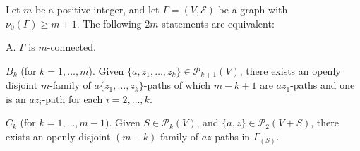 Let $m$ be a positive integer, and let $\Gamma = (V, \mathcal{E})$ be a graph with $\nu_0(\Gamma) \geq m + 1$. The following $2m$ statements are equivalent:

A. $\Gamma$ is $m$-connected.

$B_k$ (for $k = 1, \ldots, m$). Given $\{a, z_1, \ldots, z_k\} \in \mathcal{P}_{k+1}(V)$, there exists an openly disjoint $m$-family of $a\{z_1, \ldots, z_k\}$-paths of which $m - k + 1$ are $az_1$-paths and one is an $az_i$-path for each $i = 2, \ldots, k$.

$C_k$ (for $k = 1, \ldots, m - 1$). Given $S \in \mathcal{P}_k(V)$, and $\{a, z\} \in \mathcal{P}_2(V + S)$, there exists an openly-disjoint $(m - k)$-family of $az$-paths in $\Gamma_{(S)}$.
